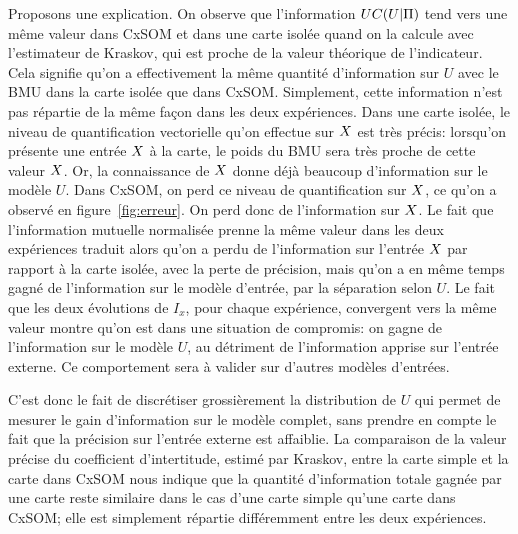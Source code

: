 Proposons une explication.
On observe que l'information $UC(U|\Pi)$ tend vers une même valeur dans CxSOM et dans une carte isolée quand on la calcule avec l'estimateur de Kraskov, qui est proche de la valeur théorique de l'indicateur. Cela signifie qu'on a effectivement la même quantité d'information sur $U$ avec le BMU dans la carte isolée que dans CxSOM. Simplement, cette information n'est pas répartie de la même façon dans les deux expériences.
Dans une carte isolée, le niveau de quantification vectorielle qu'on effectue sur $X$ est très précis: lorsqu'on présente une entrée $X$ à la carte, le poids du BMU sera très proche de cette valeur $X$. Or, la connaissance de $X$ donne déjà beaucoup d'information sur le modèle $U$.
Dans CxSOM, on perd ce niveau de quantification sur $X$, ce qu'on a observé en figure~\ref{fig:erreur}. On perd donc de l'information sur $X$. 
Le fait que l'information mutuelle normalisée prenne la même valeur dans les deux expériences traduit alors qu'on a perdu de l'information sur l'entrée $X$ par rapport à la carte isolée, avec la perte de précision, mais qu'on a en même temps gagné de l'information sur le modèle d'entrée, par la séparation selon $U$. Le fait que les deux évolutions de $I_x$, pour chaque expérience, convergent vers la même valeur montre qu'on est dans une situation de compromis: on gagne de l'information sur le modèle $U$, au détriment de l'information apprise sur l'entrée externe.
Ce comportement sera à valider sur d'autres modèles d'entrées.

C'est donc le fait de discrétiser grossièrement la distribution de $U$ qui permet de mesurer le gain d'information sur le modèle complet, sans prendre en compte le fait que la précision sur l'entrée externe est affaiblie. 
La comparaison de la valeur précise du coefficient d'intertitude, estimé par Kraskov, entre la carte simple et la carte dans CxSOM nous indique que la quantité d'information totale gagnée par une carte reste similaire dans le cas d'une carte simple qu'une carte dans CxSOM; elle est simplement répartie différemment entre les deux expériences.

